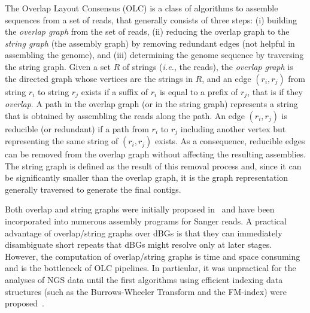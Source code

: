 \documentclass[11pt,oneside,a4paper]{article}
\begin{document}
The Overlap Layout Consensus (OLC) is a class of algorithms to assemble sequences from a set of reads, that generally consists of three steps: (i) building the
 \emph{overlap graph} from the set of reads, (ii) reducing the
overlap graph to the \emph{string graph} (the assembly graph) by removing redundant edges (not helpful in assembling the genome), and (iii)
determining the genome sequence by traversing 
the string graph. Given a set $R$ of strings (\textit{i.e.}, the reads), the \emph{overlap graph} is the directed graph whose vertices are the strings in
$R$, and an edge $(r_i,r_j)$ from string $r_i$ to string $r_j$ exists if
a suffix of $r_i$ is equal to a prefix of $r_j$, that is if they
\emph{overlap}.
A path in the overlap graph (or in the string graph) represents a string that is obtained by assembling the reads along the path.
An edge $(r_i,r_j)$ is reducible (or redundant) if a path from $r_i$ to $r_j$ including another vertex but representing the same string of $(r_i,r_j)$ exists.
As a consequence, reducible edges can be removed from the overlap graph without affecting the resulting assemblies.
The string graph is defined as the result of this removal process and, since it can be significantly smaller than the overlap graph, it is the graph representation generally traversed to generate the final contigs.

Both overlap and string graphs were initially proposed in~\cite{Myers2005} and have been incorporated into numerous assembly programs for Sanger reads.
A practical advantage of overlap/string graphs over dBGs is that they can immediately disambiguate short repeats that dBGs might resolve only at later stages.
However, the computation of overlap/string graphs is time and space consuming and is the bottleneck of OLC pipelines.
In particular, it was unpractical for the analyses of NGS data until the first algorithms using efficient indexing data structures (such as the Burrows-Wheeler Transform and the FM-index) were proposed~\cite{Simpson2012}.
\end{document}
